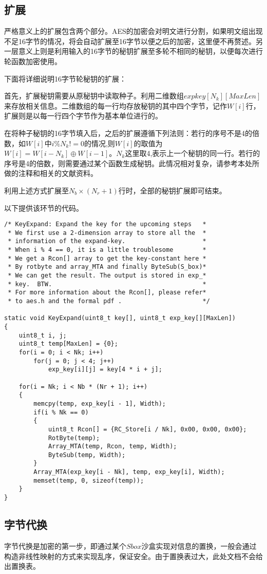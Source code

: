 \documentclass[UTF8]{ctexart}
\begin{document}
\subsection{扩展}
严格意义上的扩展包含两个部分。AES的加密会对明文进行分割，如果明文组出现不足16字节的情况，将会自动扩展至16字节以便之后的加密，这里便不再赘述。另一层意义上则是利用输入的16字节的秘钥扩展至多轮不相同的秘钥，以便每次进行轮函数加密使用。

下面将详细说明16字节轮秘钥的扩展：

首先，扩展秘钥需要从原秘钥中读取种子。利用二维数组$expkey[N_{k}][MaxLen]$来存放相关信息。二维数组的每一行均存放秘钥的其中四个字节，记作$W[i]$行，扩展则是以每一行四个字节作为基本单位进行的。

在将种子秘钥的16字节填入后，之后的扩展遵循下列法则：若行的序号不是4的倍数，如$W[i]$中$i \% N_{k} !=0$的情况,则$W[i]$的取值为$W[i] = W[i-N_{k}] \oplus W[i-1]$。$N_{k}$这里取4,表示上一个秘钥的同一行。若行的序号是4的倍数，则需要通过某个函数生成秘钥。此情况相对复杂，请参考本处所做的注释和相关的文献资料。

利用上述方式扩展至$N_{b} \times (N_{r} + 1)$行时，全部的秘钥扩展即可结束。

以下提供该环节的代码。
\lstset{basicstyle = \scriptsize}
\begin{lstlisting}
/* KeyExpand: Expand the key for the upcoming steps   *
 * We first use a 2-dimension array to store all the  *
 * information of the expand-key.                     *
 * When i % 4 == 0, it is a little troublesome        *
 * We get a Rcon[] array to get the key-constant here *
 * By rotbyte and array_MTA and finally ByteSub(S_box)*
 * We can get the result. The output is stored in exp_*
 * key.  BTW.                                         *
 * For more information about the Rcon[], please refer*
 * to aes.h and the formal pdf .                      */

static void KeyExpand(uint8_t key[], uint8_t exp_key[][MaxLen])
{
	uint8_t i, j;
	uint8_t temp[MaxLen] = {0};
	for(i = 0; i < Nk; i++)
		for(j = 0; j < 4; j++)
			exp_key[i][j] = key[4 * i + j];
	
	for(i = Nk; i < Nb * (Nr + 1); i++)
	{
		memcpy(temp, exp_key[i - 1], Width);
		if(i % Nk == 0)
		{	
			uint8_t Rcon[] = {RC_Store[i / Nk], 0x00, 0x00, 0x00};
			RotByte(temp);
			Array_MTA(temp, Rcon, temp, Width);
			ByteSub(temp, Width);
		}
		Array_MTA(exp_key[i - Nk], temp, exp_key[i], Width);
		memset(temp, 0, sizeof(temp));  
	}
}
\end{lstlisting}
\subsection{字节代换}
字节代换是加密的第一步，即通过某个$Sbox$沙盒实现对信息的置换，一般会通过构造非线性映射的方式来实现乱序，保证安全。由于置换表过大，此处文档不会给出置换表。
\end{document}
